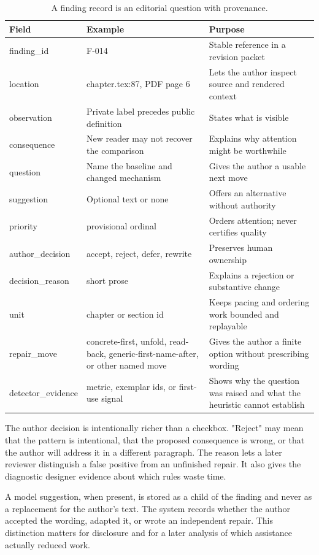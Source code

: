 \begin{table}[H]
\centering
\small
\begin{tabularx}{\textwidth}{@{}p{}p{}L@{}}
\toprule
Field & Example & Purpose \\
\midrule
finding\_id & F-014 & Stable reference in a revision packet \\
location & chapter.tex:87, PDF page 6 & Lets the author inspect source and
rendered context \\
observation & Private label precedes public definition & States what is visible \\
consequence & New reader may not recover the comparison & Explains why attention
might be worthwhile \\
question & Name the baseline and changed mechanism & Gives the author a usable
next move \\
suggestion & Optional text or none & Offers an alternative without authority \\
priority & provisional ordinal & Orders attention; never certifies quality \\
author\_decision & accept, reject, defer, rewrite & Preserves human ownership \\
decision\_reason & short prose & Explains a rejection or substantive change \\
unit & chapter or section id & Keeps pacing and ordering work bounded and
replayable \\
repair\_move & concrete-first, unfold, read-back, generic-first-name-after,
or other named move & Gives the author a finite option without prescribing
wording \\
detector\_evidence & metric, exemplar ids, or first-use signal & Shows why the
question was raised and what the heuristic cannot establish \\
\bottomrule
\end{tabularx}
\caption{A finding record is an editorial question with provenance.}
\label{tab:manual-finding-record}
\end{table}

The author decision is intentionally richer than a checkbox. "Reject" may
mean that the pattern is intentional, that the proposed consequence is wrong,
or that the author will address it in a different paragraph. The reason lets a
later reviewer distinguish a false positive from an unfinished repair. It also
gives the diagnostic designer evidence about which rules waste time.

A model suggestion, when present, is stored as a child of the finding and never
as a replacement for the author's text. The system records whether the author
accepted the wording, adapted it, or wrote an independent repair. This
distinction matters for disclosure and for a later analysis of which assistance
actually reduced work.
